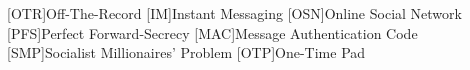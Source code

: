 \usepackage[british]{babel}
\usepackage{csquotes}
\usepackage[style=alphabetic,maxbibnames=99,backend=bibtex8]{biblatex}


\usepackage{filecontents}

\usepackage{acronym}
[OTR]{Off-The-Record}
[IM]{Instant Messaging}
[OSN]{Online Social Network}
[PFS]{Perfect Forward-Secrecy}
[MAC]{Message Authentication Code}
[SMP]{Socialist Millionaires' Problem}
[OTP]{One-Time Pad}

\usepackage{amsmath}
\usepackage{amssymb}
\DeclareMathOperator{\sign}{\mathrm{Sign}}
\DeclareMathOperator{\enc}{\mathrm{Enc}}
\DeclareMathOperator{\dec}{\mathrm{Dec}}
\DeclareMathOperator{\mac}{\mathrm{MAC}}
\newcommand{\ord}[1]{|#1|}
\DeclareMathOperator{\Z}{\mathbb Z}
\DeclareMathOperator{\K}{\mathcal K}
\DeclareMathOperator{\textand}{\qquad and\qquad}

\usepackage{algorithm}
\usepackage[noend]{algpseudocode}

\usepackage{marginnote}
\usepackage{fixme}

